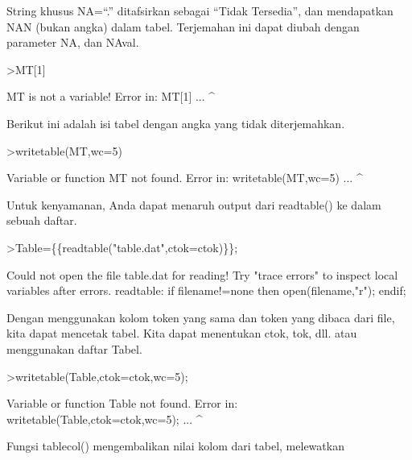 \documentclass[a4paper,10pt]{article}
\begin{document}
\begin{eulernotebook}
\begin{eulercomment}
\begin{eulercomment}
\begin{eulercomment}
\begin{eulercomment}
\begin{eulercomment}
\begin{eulercomment}
\begin{eulercomment}
\begin{eulercomment}
\begin{eulercomment}
\begin{eulercomment}
\begin{eulercomment}
\begin{eulercomment}
\begin{eulercomment}
\begin{eulercomment}
\begin{eulercomment}
\begin{eulercomment}
\begin{eulercomment}
\begin{eulercomment}
\begin{eulercomment}
String khusus NA=“.” ditafsirkan sebagai “Tidak Tersedia”, dan
mendapatkan NAN (bukan angka) dalam tabel. Terjemahan ini dapat diubah
dengan parameter NA, dan NAval.
\end{eulercomment}
\begin{eulerprompt}
>MT[1]
\end{eulerprompt}
\begin{euleroutput}
  MT is not a variable!
  Error in:
  MT[1] ...
       ^
\end{euleroutput}
\begin{eulercomment}
Berikut ini adalah isi tabel dengan angka yang tidak diterjemahkan.
\end{eulercomment}
\begin{eulerprompt}
>writetable(MT,wc=5)
\end{eulerprompt}
\begin{euleroutput}
  Variable or function MT not found.
  Error in:
  writetable(MT,wc=5) ...
               ^
\end{euleroutput}
\begin{eulercomment}
Untuk kenyamanan, Anda dapat menaruh output dari readtable() ke dalam
sebuah daftar.
\end{eulercomment}
\begin{eulerprompt}
>Table=\{\{readtable("table.dat",ctok=ctok)\}\};
\end{eulerprompt}
\begin{euleroutput}
  Could not open the file
  table.dat
  for reading!
  Try "trace errors" to inspect local variables after errors.
  readtable:
      if filename!=none then open(filename,"r"); endif;
\end{euleroutput}
\begin{eulercomment}
Dengan menggunakan kolom token yang sama dan token yang dibaca dari
file, kita dapat mencetak tabel. Kita dapat menentukan ctok, tok, dll.
atau menggunakan daftar Tabel.
\end{eulercomment}
\begin{eulerprompt}
>writetable(Table,ctok=ctok,wc=5);
\end{eulerprompt}
\begin{euleroutput}
  Variable or function Table not found.
  Error in:
  writetable(Table,ctok=ctok,wc=5); ...
                  ^
\end{euleroutput}
\begin{eulercomment}
Fungsi tablecol() mengembalikan nilai kolom dari tabel, melewatkan

\end{eulercomment}
\end{eulercomment}
\end{eulercomment}
\end{eulercomment}
\end{eulercomment}
\end{eulercomment}
\end{eulercomment}
\end{eulercomment}
\end{eulercomment}
\end{eulercomment}
\end{eulercomment}
\end{eulercomment}
\end{eulercomment}
\end{eulercomment}
\end{eulercomment}
\end{eulercomment}
\end{eulercomment}
\end{eulercomment}
\end{eulercomment}
\end{eulernotebook}
\end{document}
